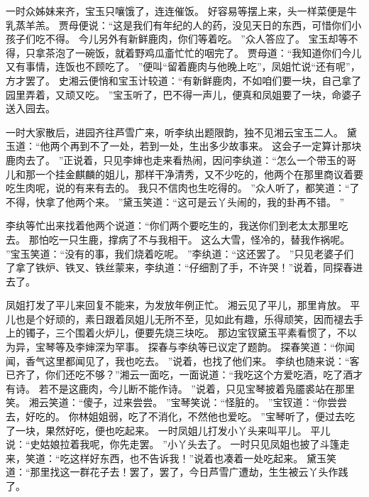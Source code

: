一时众姊妹来齐，宝玉只嚷饿了，连连催饭。
好容易等摆上来，头一样菜便是牛乳蒸羊羔。
贾母便说：“这是我们有年纪的人的药，没见天日的东西，可惜你们小孩子们吃不得。
今儿另外有新鲜鹿肉，你们等着吃。
”众人答应了。
宝玉却等不得，只拿茶泡了一碗饭，就着野鸡瓜齑忙忙的咽完了。
贾母道：“我知道你们今儿又有事情，连饭也不顾吃了。
”便叫“留着鹿肉与他晚上吃”，凤姐忙说“还有呢”，方才罢了。
史湘云便悄和宝玉计较道：“有新鲜鹿肉，不如咱们要一块，自己拿了园里弄着，又顽又吃。
”宝玉听了，巴不得一声儿，便真和凤姐要了一块，命婆子送入园去。
\par
一时大家散后，进园齐往芦雪广来，听李纨出题限韵，独不见湘云宝玉二人。
黛玉道：“他两个再到不了一处，若到一处，生出多少故事来。
这会子一定算计那块鹿肉去了。
”正说着，只见李婶也走来看热闹，因问李纨道：“怎么一个带玉的哥儿和那一个挂金麒麟的姐儿，那样干净清秀，又不少吃的，他两个在那里商议着要吃生肉呢，说的有来有去的。
我只不信肉也生吃得的。
”众人听了，都笑道：“了不得，快拿了他两个来。
”黛玉笑道：“这可是云丫头闹的，我的卦再不错。
”\par
李纨等忙出来找着他两个说道：“你们两个要吃生的，我送你们到老太太那里吃去。
那怕吃一只生鹿，撑病了不与我相干。
这么大雪，怪冷的，替我作祸呢。
”宝玉笑道：“没有的事，我们烧着吃呢。
”李纨道：“这还罢了。
”只见老婆子们了拿了铁炉、铁叉、铁丝蒙来，李纨道：“仔细割了手，不许哭！”说着，同探春进去了。
\par
凤姐打发了平儿来回复不能来，为发放年例正忙。
湘云见了平儿，那里肯放。
平儿也是个好顽的，素日跟着凤姐儿无所不至，见如此有趣，乐得顽笑，因而褪去手上的镯子，三个围着火炉儿，便要先烧三块吃。
那边宝钗黛玉平素看惯了，不以为异，宝琴等及李婶深为罕事。
探春与李纨等已议定了题韵。
探春笑道：“你闻闻，香气这里都闻见了，我也吃去。
”说着，也找了他们来。
李纨也随来说：“客已齐了，你们还吃不够？”湘云一面吃，一面说道：“我吃这个方爱吃酒，吃了酒才有诗。
若不是这鹿肉，今儿断不能作诗。
”说着，只见宝琴披着凫靥裘站在那里笑。
湘云笑道：“傻子，过来尝尝。
”宝琴笑说：“怪脏的。
”宝钗道：“你尝尝去，好吃的。
你林姐姐弱，吃了不消化，不然他也爱吃。
”宝琴听了，便过去吃了一块，果然好吃，便也吃起来。
一时凤姐儿打发小丫头来叫平儿。
平儿说：“史姑娘拉着我呢，你先走罢。
”小丫头去了。
一时只见凤姐也披了斗篷走来，笑道：“吃这样好东西，也不告诉我！”说着也凑着一处吃起来。
黛玉笑道：“那里找这一群花子去！罢了，罢了，今日芦雪广遭劫，生生被云丫头作践了。
